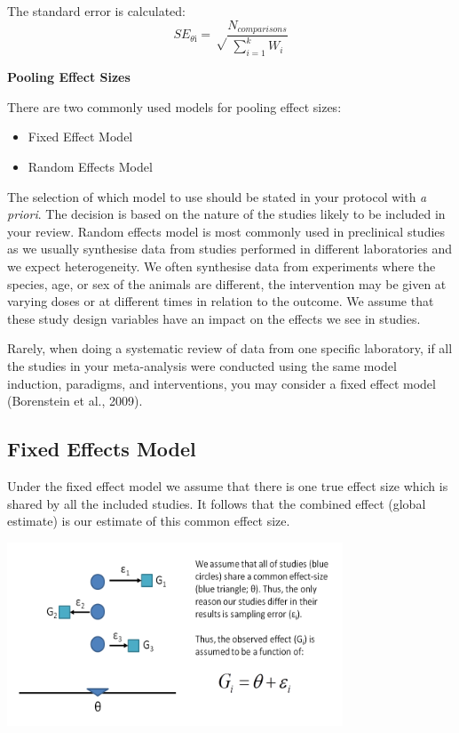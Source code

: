 \documentclass[
]{book}
\providecommand{\tightlist}{%
  \setlength{\itemsep}{0pt}\setlength{\parskip}{0pt}}
\begin{document}
The standard error is calculated:
\[SE_{\theta\text{i}} = \sqrt \frac{N_{comparisons}}{\sum_{i=1}^{k} W_i} \]

\textbf{Pooling Effect Sizes}

There are two commonly used models for pooling effect sizes:

\begin{itemize}
\tightlist
\item
  Fixed Effect Model
\item
  Random Effects Model
\end{itemize}

The selection of which model to use should be stated in your protocol with \emph{a priori}. The decision is based on the nature of the studies likely to be included in your review. Random effects model is most commonly used in preclinical studies as we usually synthesise data from studies performed in different laboratories and we expect heterogeneity. We often synthesise data from experiments where the species, age, or sex of the animals are different, the intervention may be given at varying doses or at different times in relation to the outcome. We assume that these study design variables have an impact on the effects we see in studies.

Rarely, when doing a systematic review of data from one specific laboratory, if all the studies in your meta-analysis were conducted using the same model induction, paradigms, and interventions, you may consider a fixed effect model (Borenstein et al., 2009).

\subsection{Fixed Effects Model}\label{fixed-effects-model}

Under the fixed effect model we assume that there is one true effect size which is shared by all the included studies. It follows that the combined effect (global estimate) is our estimate of this common effect size.

\includegraphics[width=0.75\textwidth,height=\textheight]{figs/fixedeffects.png}
\end{document}
